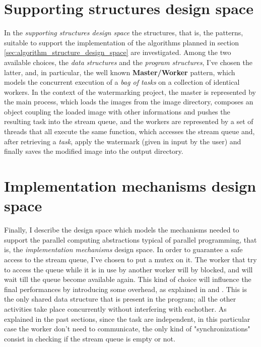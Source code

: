     \section{Supporting structures design space} %
    \label{sec:supporting_structures_design_space}
        In the \textit{supporting structures design space} the structures, that is, the
        patterns, suitable to support the implementation of the algorithms planned in section
        \ref{sec:algorithm_structure_design_space} are investigated. Among the two available choices,
        the \textit{data structures} and the \textit{program structures}, I've chosen the latter, and, in
        particular, the well known \textbf{Master/Worker} pattern, which models the concurrent execution of a
        \textit{bag of tasks} on a collection of identical workers. In the context of the watermarking project,
        the master is represented by the main process, which loads the images from the image directory,
        composes an object coupling the loaded image with other informations and
        pushes the resulting task into the stream queue, and the workers are represented by a set of
        threads that all execute the same function, which accesses the stream queue and, after retrieving a
        \textit{task}, apply the watermark (given in input by the user) and finally saves the modified image
        into the output directory.

    \section{Implementation mechanisms design space} %
    \label{sec:implementation_mechanisms_design_space}
        Finally, I describe the design space which models the mechanisms needed to support the
        parallel computing abstractions typical of parallel programming, that is, the \textit{implementation
        mechanisms} design space. In order to guarantee a safe access to the stream queue, I've chosen to put a
        mutex on it. The worker that try to access the queue while it is in use by another worker will by
        blocked, and will wait till the queue become available again. This kind of choice will influence the
        final performances by introducing some overhead, as explained in \cite{DSPM} and \cite{spp}.
        This is the only shared data structure that is present in the program; all the other activities take
        place concurrently without interfering with eachother. As explained in the past sections, since the task
        are independent, in this particular case the worker don't need to communicate, the only kind of
        "synchronizations" consist in checking if the stream queue is empty or not.

